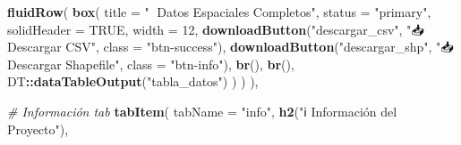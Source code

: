 \documentclass[
]{article}
\newenvironment{Shaded}{\begin{snugshade}}{\end{snugshade}}
\newcommand{\AttributeTok}[1]{\textcolor[rgb]{0.13,0.29,0.53}{#1}}
\newcommand{\CommentTok}[1]{\textcolor[rgb]{0.56,0.35,0.01}{\textit{#1}}}
\newcommand{\ConstantTok}[1]{\textcolor[rgb]{0.56,0.35,0.01}{#1}}
\newcommand{\DecValTok}[1]{\textcolor[rgb]{0.00,0.00,0.81}{#1}}
\newcommand{\FunctionTok}[1]{\textcolor[rgb]{0.13,0.29,0.53}{\textbf{#1}}}
\newcommand{\NormalTok}[1]{#1}
\newcommand{\SpecialCharTok}[1]{\textcolor[rgb]{0.81,0.36,0.00}{\textbf{#1}}}
\newcommand{\StringTok}[1]{\textcolor[rgb]{0.31,0.60,0.02}{#1}}
\begin{document}
\begin{Shaded}
\begin{Highlighting}[]
        \FunctionTok{fluidRow}\NormalTok{(}
          \FunctionTok{box}\NormalTok{(}
            \AttributeTok{title =} \StringTok{"💾 Datos Espaciales Completos"}\NormalTok{, }
            \AttributeTok{status =} \StringTok{"primary"}\NormalTok{, }\AttributeTok{solidHeader =} \ConstantTok{TRUE}\NormalTok{,}
            \AttributeTok{width =} \DecValTok{12}\NormalTok{,}
            \FunctionTok{downloadButton}\NormalTok{(}\StringTok{"descargar\_csv"}\NormalTok{, }\StringTok{"📥 Descargar CSV"}\NormalTok{, }
                           \AttributeTok{class =} \StringTok{"btn{-}success"}\NormalTok{),}
            \FunctionTok{downloadButton}\NormalTok{(}\StringTok{"descargar\_shp"}\NormalTok{, }\StringTok{"📥 Descargar Shapefile"}\NormalTok{,}
                           \AttributeTok{class =} \StringTok{"btn{-}info"}\NormalTok{),}
            \FunctionTok{br}\NormalTok{(), }\FunctionTok{br}\NormalTok{(),}
\NormalTok{            DT}\SpecialCharTok{::}\FunctionTok{dataTableOutput}\NormalTok{(}\StringTok{"tabla\_datos"}\NormalTok{)}
\NormalTok{          )}
\NormalTok{        )}
\NormalTok{      ),}
      
      \CommentTok{\# Información tab}
      \FunctionTok{tabItem}\NormalTok{(}
        \AttributeTok{tabName =} \StringTok{"info"}\NormalTok{,}
        \FunctionTok{h2}\NormalTok{(}\StringTok{"ℹ️ Información del Proyecto"}\NormalTok{),}
        

\end{Highlighting}
\end{Shaded}
\end{document}
